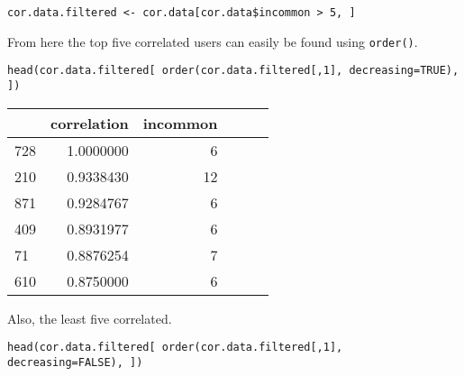 \documentclass[12pt, a4paper]{article}
\newcommand{\code}[1]{\texttt{#1}}
\begin{document}
\begin{minipage}{\linewidth} %
\vspace{2em}
\begin{verbatim}
cor.data.filtered <- cor.data[cor.data$incommon > 5, ]
\end{verbatim}
\vspace{2em}
\end{minipage}

\noindent
From here the top five correlated users can easily be found using \code{order()}.

\begin{minipage}{\linewidth} %
\vspace{2em}
\begin{verbatim}
head(cor.data.filtered[ order(cor.data.filtered[,1], decreasing=TRUE), ])
\end{verbatim}
\vspace{2em}
\end{minipage}

\begin{minipage}{\linewidth} %
\vspace{2em}
\centering
\begin{tabular}{|l|r|r|l|l|l|}
        \hline
          & correlation & incommon\\
        \hline
        728 & 1.0000000 & 6\\
        \hline
        210 & 0.9338430 & 12\\
        \hline
        871 & 0.9284767 & 6\\
        \hline
        409 & 0.8931977 & 6\\
        \hline
        71 & 0.8876254 & 7\\
        \hline
        610 & 0.8750000 & 6\\
        \hline
\end{tabular}
\vspace{2em}
\end{minipage}


\newpage
Also, the least five correlated.

\begin{minipage}{\linewidth} %
\vspace{2em}
\begin{verbatim}
head(cor.data.filtered[ order(cor.data.filtered[,1], decreasing=FALSE), ])
\end{verbatim}
\vspace{2em}
\end{minipage}
\end{document}
